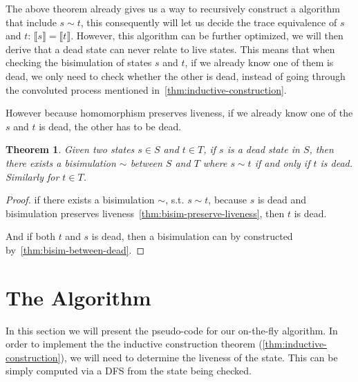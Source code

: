\documentclass{extarticle}
\newtheorem{theorem}{Theorem}
\begin{document}
The above theorem already gives us a way to recursively construct a algorithm that include \(s ∼ t\), this consequently will let us decide the trace equivalence of \(s\) and \(t\): \(⟦s⟧ = ⟦t⟧\).
However, this algorithm can be further optimized, we will then derive that a dead state can never relate to live states. This means that when checking the bisimulation of states \(s\) and \(t\), if we already know one of them is dead, we only need to check whether the other is dead, instead of going through the convoluted process mentioned in~\cref{thm:inductive-construction}.

However because homomorphism preserves liveness, if we already know one of the \(s\) and \(t\) is dead, the other has to be dead.

\begin{theorem}\label{thm:bisim-one-dead}
    Given two states \(s ∈ S\) and \(t ∈ T\), if \(s\) is a dead state in \(S\), then there exists a bisimulation \(∼\) between \(S\) and \(T\) where \(s ∼ t\) if and only if \(t\) is dead. Similarly for \(t ∈ T\).
\end{theorem}

\begin{proof}
    if there exists a bisimulation \(∼\), s.t. \(s ∼ t\), because \(s\) is dead and bisimulation preserves liveness~\cref{thm:bisim-preserve-liveness}, then \(t\) is dead. 

    And if both \(t\) and \(s\) is dead, then a bisimulation can by constructed by~\cref{thm:bisim-between-dead}.
\end{proof}

\section{The Algorithm}

In this section we will present the pseudo-code for our on-the-fly algorithm. 
In order to implement the the inductive construction theorem (\cref{thm:inductive-construction}), we will need to determine the liveness of the state. This can be simply computed via a DFS from the state being checked. 
\end{document}
